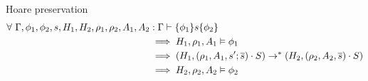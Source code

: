 \documentclass[11pt,a4paper]{article}
\begin{document}
Hoare preservation
\begin{align*}
\forall~ \Gamma, \phi_1, \phi_2, s, H_1, H_2, \rho_1, \rho_2, A_1, A_2 &: \Gamma\vdash\{\phi_1\}s\{\phi_2\} 
\\ &\implies H_1,\rho_1,A_1 \vDash \phi_1
\\ &\implies (H_1, (\rho_1, A_1, s' ; \overline{s}) \cdot S)
  \rightarrow^* (H_2, (\rho_2, A_2, \overline{s}) \cdot S)
\\ &\implies H_2,\rho_2,A_2 \vDash \phi_2
\end{align*}
\end{document}
